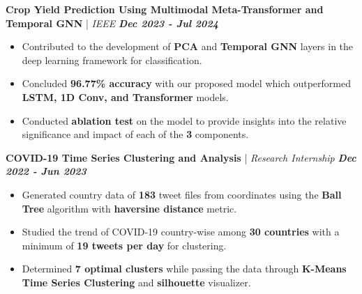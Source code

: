 \documentclass[a4paper,9pt]{extarticle}
\begin{document}
\vspace{-0.15cm}
\noindent
\textbf{Crop Yield Prediction Using Multimodal Meta-Transformer and Temporal GNN} | \textit{IEEE} \hfill \textbf{\textit{Dec 2023 - Jul 2024}} %
\vspace{-0.1cm}
\begin{itemize}
    \item Contributed to the development of \textbf{PCA} and \textbf{Temporal GNN} layers in the deep learning framework for classification.
    \item Concluded \textbf{96.77\% accuracy} with our proposed model which outperformed \textbf{LSTM, 1D Conv, and Transformer} models.
    \item Conducted \textbf{ablation test} on the model to provide insights into the relative significance and impact of each of the \textbf{3} components.
\end{itemize}


\vspace{-0.05cm}
\noindent
\textbf{COVID-19 Time Series Clustering and Analysis} | \textit{Research Internship} \hfill \textbf{\textit{Dec 2022 - Jun 2023}} %
\vspace{-0.15cm}
\begin{itemize}
    \item Generated country data of \textbf{183} tweet files from coordinates using the \textbf{Ball Tree} algorithm with \textbf{haversine distance} metric.
    \item Studied the trend of COVID-19 country-wise among \textbf{30 countries} with a minimum of \textbf{19 tweets per day} for clustering.
    \item Determined \textbf{7 optimal clusters} while passing the data through \textbf{K-Means Time Series Clustering} and \textbf{silhouette} visualizer.
\end{itemize}
\end{document}
